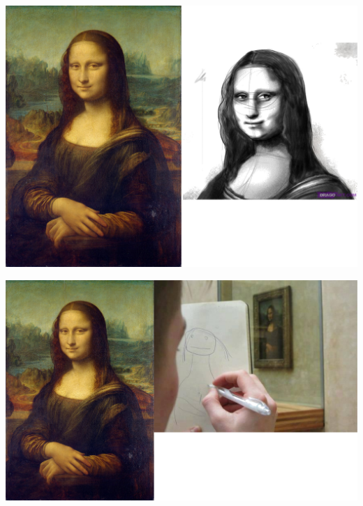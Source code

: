 \documentclass{beamer}
\begin{document}
\begin{frame}[c]
\begin{center}\vspace*{-0.5cm}
  \hspace*{-0.75cm}\includegraphics[scale=0.18]{MonaLisaComp1t.png}
\end{center}
\end{frame}

\begin{frame}[c]
\begin{center}
\hspace*{-0.75cm}\includegraphics[scale=0.17]{MonaLisaComp2t.png}
\end{center}
\end{frame}
\end{document}
